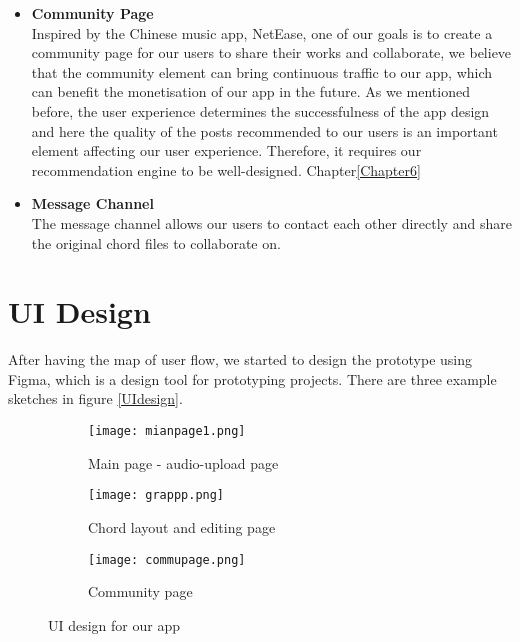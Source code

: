 \begin{itemize}
\item \textbf{Community Page}
\\Inspired by the Chinese music app, NetEase, one of our goals is to create a community page for our users to share their works and collaborate, 
we believe that the community element can bring continuous traffic to our app, which can benefit the monetisation of our app in the future.
As we mentioned before, the user experience determines the successfulness of the app design and here the quality of the posts recommended to our users is an important element affecting our user experience. 
Therefore, it requires our recommendation engine to be well-designed. Chapter\ref{Chapter6}

\item \textbf{Message Channel}
\\The message channel allows our users to contact each other directly and share the original chord files to collaborate on.

\end{itemize}

\section{UI Design}
After having the map of user flow, we started to design the prototype using Figma, which is a design tool for prototyping projects. 
There are three example sketches in figure \ref{UIdesign}. 

\begin{figure}[ht]
    \label{UIdesign}
     \centering
     \hspace{16mm}
     \begin{subfigure}[b]{0.2\textwidth}
         \centering
         \texttt{[image: mianpage1.png]}
         \caption{Main page - audio-upload page}
         \label{Mainpage}
     \end{subfigure}
     \hfill
     \begin{subfigure}[b]{0.2\textwidth}
         \centering
         \texttt{[image: grappp.png]}
         \caption{Chord layout and editing page}
         \label{chordedit}
     \end{subfigure}
     \hfill
     \begin{subfigure}[b]{0.2\textwidth}
         \centering
         \texttt{[image: commupage.png]}
         \caption{Community page}
         \label{Community page}
     \end{subfigure}
     \hspace{16mm}
        \caption{UI design for our app}
        \label{fig:three graphs}
\end{figure}

